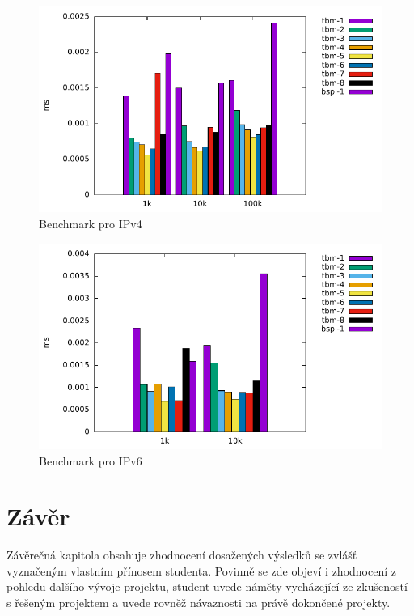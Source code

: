 \begin{figure}[!htb]
	\centering
	\includegraphics[scale=1]{fig/lpm-ipv4.pdf}
	\caption{Benchmark pro IPv4}
\end{figure}\label{fig:lpm-ipv4}

\begin{figure}[!htb]
	\centering
	\includegraphics[scale=1]{fig/lpm-ipv6.pdf}
	\caption{Benchmark pro IPv6}
\end{figure}\label{fig:lpm-ipv4}

\chapter{Závěr}\label{chapter:conclusion}
Závěrečná kapitola obsahuje zhodnocení dosažených výsledků se zvlášť vyznačeným vlastním přínosem studenta. Povinně se zde objeví i zhodnocení z pohledu dalšího vývoje projektu, student uvede náměty vycházející ze zkušeností s řešeným projektem a uvede rovněž návaznosti na právě dokončené projekty.


